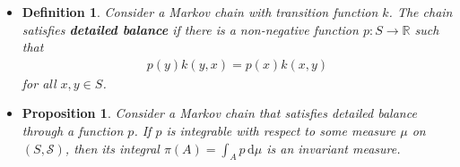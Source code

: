 \documentclass[10pt]{article}
\newtheorem{definition}[lemma]{Definition}
\newtheorem{proposition}[lemma]{Proposition}
\newcommand{\dee}{\mathrm{d}}
\newcommand{\mcal}[1]{\mathcal{#1}}
\newcommand{\Real}{\mathbb{R}}
\begin{document}
\begin{itemize}
  \item \begin{definition}
    Consider a Markov chain with transition function $k$. The chain satisfies {\bf detailed balance} if there is a non-negative function $p: S \rightarrow \Real$ such that
    \begin{align*}
      p(y)k(y,x) = p(x)k(x,y)
    \end{align*}
    for all $x,y \in S$.
  \end{definition}

  \item \begin{proposition}
    Consider a Markov chain that satisfies detailed balance through a function $p$.
    If $p$ is integrable with respect to some measure $\mu$ on $(S,\mcal{S})$, then its integral $\pi(A) = \int_A p\, \dee\mu$ is an invariant measure.
  \end{proposition}
\end{itemize}


  
\end{document}
